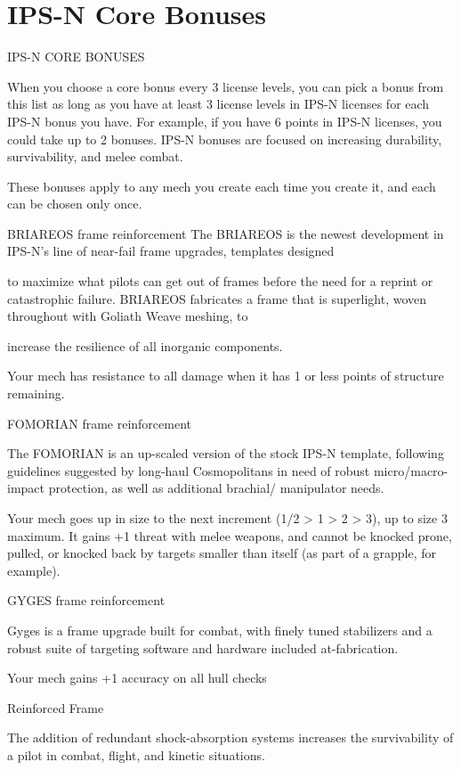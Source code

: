 \section{IPS-N Core Bonuses}


                                        IPS-N CORE BONUSES  

When you choose a core bonus every 3 license levels, you can pick a bonus from this list as long  
as you have at least 3 license levels in IPS-N licenses for each IPS-N bonus you have. For  
example, if you have 6 points in IPS-N licenses, you could take up to 2 bonuses. IPS-N bonuses  
are focused on increasing durability, survivability, and melee combat.
 

These bonuses apply to any mech you create each time you create it, and each can be chosen  
only once.
 

BRIAREOS frame reinforcement  
The BRIAREOS is the newest development in IPS-N’s line of near-fail frame upgrades, templates designed  

to maximize what pilots can get out of frames before the need for a reprint or catastrophic failure.  
BRIAREOS fabricates a frame that is superlight, woven throughout with Goliath Weave meshing, to  

increase the resilience of all inorganic components.   

Your mech has resistance to all damage when it has 1 or less points of structure remaining.
 

FOMORIAN frame reinforcement  

The FOMORIAN is an up-scaled version of the stock IPS-N template, following guidelines suggested by  
long-haul Cosmopolitans in need of robust micro/macro-impact protection, as well as additional brachial/ 
manipulator needs.  

Your mech goes up in size to the next increment (1/2 > 1 > 2 > 3), up to size 3 maximum. It gains  
+1 threat with melee weapons, and cannot be knocked prone, pulled, or knocked back by  
targets smaller than itself (as part of a grapple, for example).
 

GYGES frame reinforcement  

Gyges is a frame upgrade built for combat, with finely tuned stabilizers and a robust suite of targeting  
software and hardware included at-fabrication.   

Your mech gains +1 accuracy on all hull checks
 

Reinforced Frame  

The addition of redundant shock-absorption systems increases the survivability of a pilot in combat, flight,  
and kinetic situations.   

